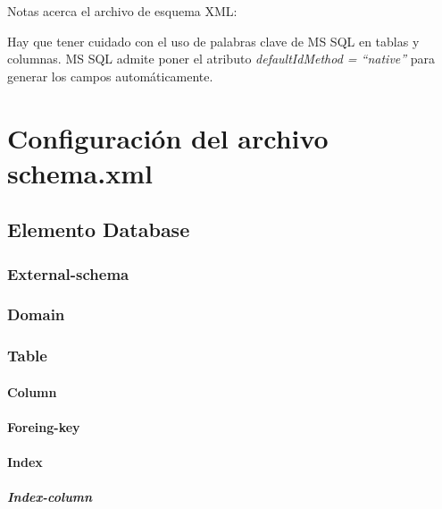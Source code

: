 \documentclass[12pt, oneside]{article}
\begin{document}
Notas acerca el archivo de esquema XML:

Hay que tener cuidado con el uso de palabras clave de MS SQL en tablas y columnas. 
MS SQL admite poner el atributo {\em defaultIdMethod = “native”} para generar los campos automáticamente.

\section{Configuración del archivo schema.xml}
	

	\subsection{Elemento Database}
		

		\subsubsection{External-schema}
			

		\subsubsection{Domain}
			

		\subsubsection{Table}
			

			\paragraph{Column}
				

			\paragraph{Foreing-key}
				

			\paragraph{Index}
				

				\subparagraph{Index-column}
					
\end{document}
